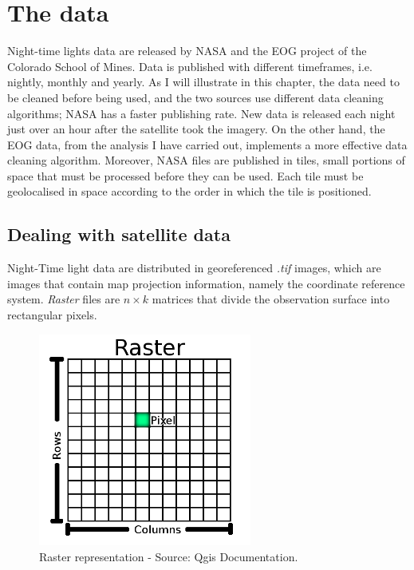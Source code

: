 \chapter{The data}\label{ch:mathtest} %
Night-time lights data are released by NASA and the EOG project of the Colorado School of Mines. Data is published with different timeframes, i.e. nightly, monthly and yearly.
As I will illustrate in this chapter, the data need to be cleaned before being used, and the two sources use different data cleaning algorithms; NASA has a faster publishing rate. New data is released each night just over an hour after the satellite took the imagery. On the other hand, the EOG data, from the analysis I have carried out, implements a more effective data cleaning algorithm. Moreover, NASA files are published in tiles, small portions of space that must be processed before they can be used. Each tile must be geolocalised in space according to the order in which the tile is positioned.

\section{Dealing with satellite data}

Night-Time light data are distributed in georeferenced \textit{.tif} images, which are images that contain map projection information, namely the coordinate reference system. 
\textit{Raster} files are  $n \times k$  matrices that divide the observation surface into rectangular pixels.

\begin{figure}[h]
    \begin{center}
    \includegraphics[width=7cm]{images/raster_dataset.png}
    \end{center}
    \caption{Raster representation - Source: Qgis Documentation.}
\end{figure}


